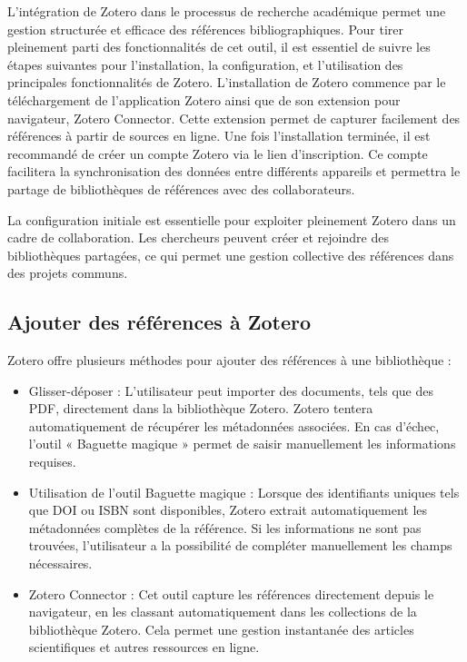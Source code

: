 \documentclass[
  letterpaper,
  DIV=11,
  numbers=noendperiod]{scrreprt}
\begin{document}
L'intégration de Zotero dans le processus de recherche académique permet
une gestion structurée et efficace des références bibliographiques. Pour
tirer pleinement parti des fonctionnalités de cet outil, il est
essentiel de suivre les étapes suivantes pour l'installation, la
configuration, et l'utilisation des principales fonctionnalités de
Zotero. L'installation de Zotero commence par le téléchargement de
l'application Zotero ainsi que de son extension pour navigateur, Zotero
Connector. Cette extension permet de capturer facilement des références
à partir de sources en ligne. Une fois l'installation terminée, il est
recommandé de créer un compte Zotero via le lien d'inscription. Ce
compte facilitera la synchronisation des données entre différents
appareils et permettra le partage de bibliothèques de références avec
des collaborateurs.

La configuration initiale est essentielle pour exploiter pleinement
Zotero dans un cadre de collaboration. Les chercheurs peuvent créer et
rejoindre des bibliothèques partagées, ce qui permet une gestion
collective des références dans des projets communs.

\subsection{Ajouter des références à
Zotero}\label{ajouter-des-ruxe9fuxe9rences-uxe0-zotero}

Zotero offre plusieurs méthodes pour ajouter des références à une
bibliothèque :

\begin{itemize}
\item
  Glisser-déposer : L'utilisateur peut importer des documents, tels que
  des PDF, directement dans la bibliothèque Zotero. Zotero tentera
  automatiquement de récupérer les métadonnées associées. En cas
  d'échec, l'outil « Baguette magique » permet de saisir manuellement
  les informations requises.
\item
  Utilisation de l'outil Baguette magique : Lorsque des identifiants
  uniques tels que DOI ou ISBN sont disponibles, Zotero extrait
  automatiquement les métadonnées complètes de la référence. Si les
  informations ne sont pas trouvées, l'utilisateur a la possibilité de
  compléter manuellement les champs nécessaires.
\item
  Zotero Connector : Cet outil capture les références directement depuis
  le navigateur, en les classant automatiquement dans les collections de
  la bibliothèque Zotero. Cela permet une gestion instantanée des
  articles scientifiques et autres ressources en ligne.
\end{itemize}
\end{document}
